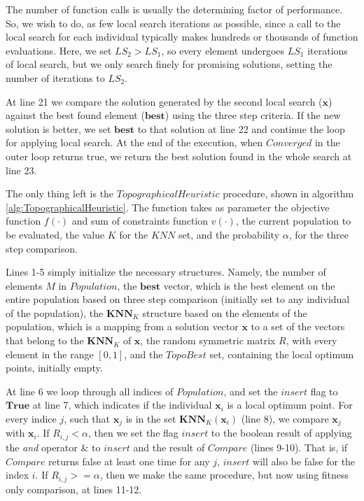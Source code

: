 
The number of function calls is usually the determining factor of performance. So, we wish to do, as few local search iterations as possible, since a call to the local search for each individual typically makes hundreds or thousands of function evaluations. Here, we set $LS_2 > LS_1$, so every element undergoes $LS_1$ iterations of local search, but we only search finely for promising solutions, setting the number of iterations to $LS_2$.

At line 21 we compare the solution generated by the second local search ($\bm{x}$) against the best found element ($\bm{best}$) using the three step criteria. If the new solution is better, we set $\bm{best}$ to that solution at line 22 and continue the loop for applying local search. At the end of the execution, when $Converged$ in the outer loop returns true, we return the best solution found in the whole search at line 23.

The only thing left is the $TopographicalHeuristic$ procedure, shown in algorithm \ref{alg:TopographicalHeuristic}. The function takes as parameter the objective function $f(\cdot)$ and sum of constraints function $v(\cdot)$, the current population to be evaluated, the value $K$ for the $KNN$ set, and the probability $\alpha$, for the three step comparison.





Lines 1-5 simply initialize the necessary structures. Namely, the number of elements $M$ in $Population$, the $\bm{best}$ vector, which is the best element on the entire population based on three step comparison (initially set to any individual of the population), the $\bm{KNN}_K$ structure based on the elements of the population, which is a mapping from a solution vector $\bm{x}$ to a set of the vectors that belong to the $\bm{KNN}_K$ of $\bm{x}$, the random symmetric matrix $R$, with every element in the range $[0, 1]$, and the $TopoBest$ set, containing the local optimum points, initially empty.

At line 6 we loop through all indices of $Population$, and set the $insert$ flag to $\bm{True}$ at line 7, which indicates if the individual $\bm{x}_i$ is a local optimum point. For every indice $j$, such that $\bm{x}_j$ is in the set $\bm{KNN}_K(\bm{x}_i)$ (line 8), we compare $\bm{x}_j$ with $\bm{x}_i$. If $R_{i, j} < \alpha$, then we set the flag $insert$ to the boolean result of applying the \textit{and} operator $\&$ to $insert$ and the result of $Compare$ (lines 9-10). That is, if $Compare$ returns false at least one time for any $j$, $insert$ will also be false for the index $i$. If $R_{i, j} >= \alpha$, then we make the same procedure, but now using fitness only comparison, at lines 11-12.

